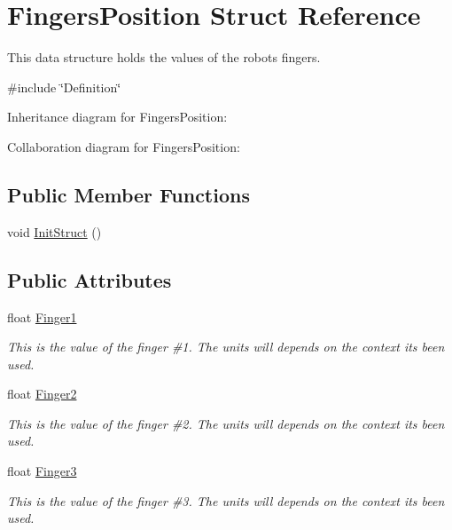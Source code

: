 \hypertarget{struct_fingers_position}{}\section{Fingers\+Position Struct Reference}
\label{struct_fingers_position}


This data structure holds the values of the robot\textquotesingle{}s fingers.  




{\ttfamily \#include \char`\"{}Definition\char`\"{}}



Inheritance diagram for Fingers\+Position\+:


Collaboration diagram for Fingers\+Position\+:
\subsection*{Public Member Functions}
\begin{DoxyCompactItemize}
\item 
void \hyperlink{struct_fingers_position_a2d958923675995d54d56e59f8549495d}{Init\+Struct} ()
\end{DoxyCompactItemize}
\subsection*{Public Attributes}
\begin{DoxyCompactItemize}
\item 
float \hyperlink{struct_fingers_position_a216f8d64e6a9c7aab84e4269ccb27e66}{Finger1}
\begin{DoxyCompactList}\small\item\em This is the value of the finger \#1. The units will depends on the context it\textquotesingle{}s been used. \end{DoxyCompactList}\item 
float \hyperlink{struct_fingers_position_a0ec9675672721d61fb13bbc2db3d3ef9}{Finger2}
\begin{DoxyCompactList}\small\item\em This is the value of the finger \#2. The units will depends on the context it\textquotesingle{}s been used. \end{DoxyCompactList}\item 
float \hyperlink{struct_fingers_position_a03c819e4c20367e36e62a864bf829160}{Finger3}
\begin{DoxyCompactList}\small\item\em This is the value of the finger \#3. The units will depends on the context it\textquotesingle{}s been used. \end{DoxyCompactList}\end{DoxyCompactItemize}


